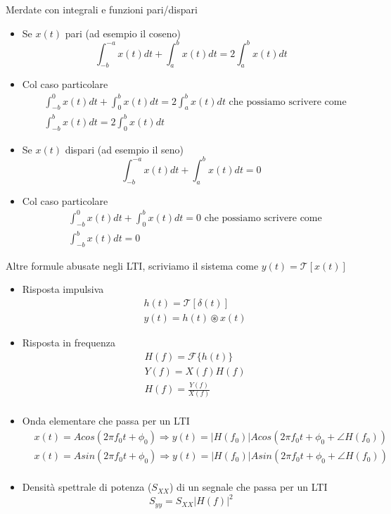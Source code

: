 \documentclass{article}
\begin{document}
Merdate con integrali e funzioni pari/dispari
\begin{itemize}
  \item Se $x(t)$ pari (ad esempio il coseno) \begin{equation*}
    \int_{-b}^{-a} x(t) dt + \int_{a}^{b} x(t) dt = 2\int_{a}^{b} x(t) dt
  \end{equation*}

  \item Col caso particolare \begin{align*}
    &\int_{-b}^{0} x(t) dt + \int_{0}^{b} x(t) dt = 2\int_{a}^{b} x(t) dt \text{ che possiamo scrivere come}\\
    &\int_{-b}^{b} x(t) dt = 2\int_{0}^{b} x(t) dt
  \end{align*}

  \item Se $x(t)$ dispari (ad esempio il seno) \begin{equation*}
    \int_{-b}^{-a} x(t) dt + \int_{a}^{b} x(t) dt = 0
  \end{equation*}

  \item Col caso particolare \begin{align*}
    &\int_{-b}^{0} x(t) dt + \int_{0}^{b} x(t) dt = 0 \text{ che possiamo scrivere come}\\
    &\int_{-b}^{b} x(t) dt = 0
  \end{align*}
\end{itemize}

Altre formule abusate negli LTI, scriviamo il sistema come $y(t) = \mathcal{T}[x(t)]$
\begin{itemize}
  \item Risposta impulsiva \begin{align*}
    &h(t) = \mathcal{T}[\delta (t)]\\
    &y(t) = h(t) \circledast x(t)
  \end{align*}
  
  \item Risposta in frequenza \begin{align*}
    &H(f) = \mathcal{F}\{h(t)\}\\
    &Y(f) = X(f) H(f)\\
    &H(f) = \frac{Y(f)}{X(f)}\\
  \end{align*}
    
  \item Onda elementare che passa per un LTI \begin{align*}
    &x(t) = A cos(2\pi f_0t + \phi_0) \Longrightarrow y(t) = \lvert H(f_0) \rvert A cos(2\pi f_0t + \phi_0 + \angle H(f_0))\\
    &x(t) = A sin(2\pi f_0t + \phi_0) \Longrightarrow y(t) = \lvert H(f_0) \rvert A sin(2\pi f_0t + \phi_0 + \angle H(f_0))\\
  \end{align*}
    
  \item Densità spettrale di potenza ($S_{XX}$) di un segnale che passa per un LTI \begin{equation*}
    S_{yy} = S_{XX} \lvert H(f) \rvert ^2
  \end {equation*}
\end{itemize}
\end{document}
